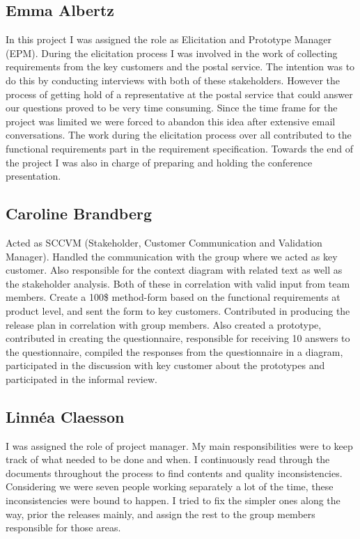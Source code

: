 \documentclass[10pt,a4paper]{article}
\begin{document}
\subsection{Emma Albertz}
In this project I was assigned the role as Elicitation and Prototype Manager (EPM). During the elicitation process I was involved in the work of collecting requirements from the key customers and the postal service. The intention was to do this by conducting interviews with both of these stakeholders. However the process of getting hold of a representative at the postal service that could answer our questions proved to be very time consuming. Since the time frame for the project was limited we were forced to abandon this idea after extensive email conversations. The work during the elicitation process over all contributed to the functional requirements part in the requirement specification. Towards the end of the project I was also in charge of preparing and holding the conference presentation. 

\subsection{Caroline Brandberg}
Acted as SCCVM (Stakeholder, Customer Communication and Validation Manager). Handled the communication with the group where we acted as key customer. Also responsible for the context diagram with related text as well as the stakeholder analysis. Both of these in correlation with valid input from team members. Create a 100\$ method-form based on the functional requirements at product level, and sent the form to key customers. Contributed in producing the release plan in correlation with group members.  Also created a prototype, contributed in creating the questionnaire, responsible for receiving 10 answers to the questionnaire, compiled the responses from the questionnaire in a diagram, participated in the discussion with key customer about the prototypes and participated in the informal review. 

\subsection{Linn\'ea Claesson}
I was assigned the role of project manager. My main responsibilities were to keep track of what needed to be done and when. I continuously read through the documents throughout the process to find contents and quality  inconsistencies. Considering we were seven people working separately a lot of the time, these inconsistencies were bound to happen. I tried to fix the simpler ones along the way, prior the releases mainly, and assign the rest to the group members responsible for those areas.
\end{document}

